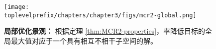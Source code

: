 \documentclass[../../book-main_zh.tex]{subfiles}
\begin{document}




\begin{figure}[t]
	\centering
	\texttt{[image: \\toplevelprefix/chapters/chapter3/figs/mcr2-global.png]}
	\caption{{\bf 局部优化景观：} 根据定理 \ref{thm:MCR2-properties}，率降低目标的全局最大值对应于一个具有相互不相干子空间的解。}
	\label{fig:mcr-global}
\end{figure}
\end{document}
